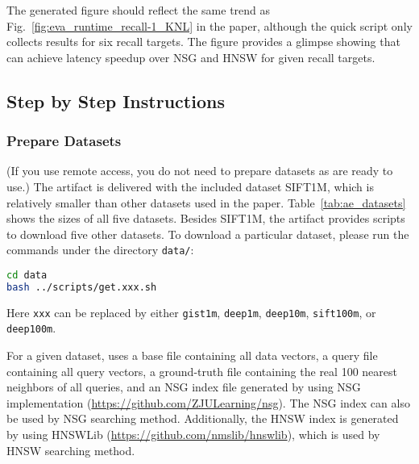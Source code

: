 The generated figure should reflect the same trend as Fig.~\ref{fig:eva_runtime_recall-1_KNL} in the paper, although the quick script only collects results for six recall targets. The figure provides a glimpse showing that \Hammer can achieve latency speedup over NSG and HNSW for given recall targets.


\subsection{Step by Step Instructions}

\subsubsection{Prepare Datasets}

(If you use remote access, you do not need to prepare datasets as are ready to use.) The artifact is delivered with the included dataset SIFT1M, which is relatively smaller than other datasets used in the paper. 
Table~\ref{tab:ae_datasets} shows the sizes of all five datasets. 
Besides SIFT1M, the artifact provides scripts to download five other datasets. To download a particular dataset, please run the commands under the directory \verb|data/|:
\begin{lstlisting}[language=bash]
cd data
bash ../scripts/get.xxx.sh
\end{lstlisting}
Here \verb|xxx| can be replaced by either \verb|gist1m|, \verb|deep1m|, \verb|deep10m|, \verb|sift100m|, or \verb|deep100m|.


For a given dataset, \Hammer uses a base file containing all data vectors, a query file containing all query vectors, a ground-truth file containing the real 100 nearest neighbors of all queries, and an NSG index file generated by using NSG implementation (\url{https://github.com/ZJULearning/nsg}). 
The NSG index can also be used by NSG searching method.
Additionally, the HNSW index is generated by using HNSWLib (\url{https://github.com/nmslib/hnswlib}), which is used by HNSW searching method.


